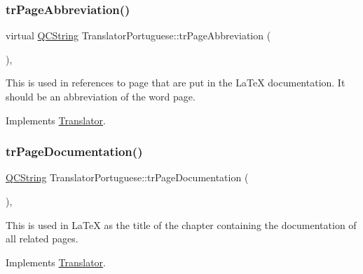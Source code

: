 \mbox{\label{class_translator_portuguese_a14ece07610419a00727fcd6fd852d556}} 
\subsubsection{\texorpdfstring{trPageAbbreviation()}{trPageAbbreviation()}}
{\footnotesize\ttfamily virtual \mbox{\hyperlink{class_q_c_string}{Q\+C\+String}} Translator\+Portuguese\+::tr\+Page\+Abbreviation (\begin{DoxyParamCaption}{ }\end{DoxyParamCaption})\hspace{0.3cm}{\ttfamily [inline]}, {\ttfamily [virtual]}}

This is used in references to page that are put in the La\+TeX documentation. It should be an abbreviation of the word page. 

Implements \mbox{\hyperlink{class_translator}{Translator}}.

\mbox{\label{class_translator_portuguese_a74d1d84882e71ad90a84cacdd585f2f1}} 
\subsubsection{\texorpdfstring{trPageDocumentation()}{trPageDocumentation()}}
{\footnotesize\ttfamily \mbox{\hyperlink{class_q_c_string}{Q\+C\+String}} Translator\+Portuguese\+::tr\+Page\+Documentation (\begin{DoxyParamCaption}{ }\end{DoxyParamCaption})\hspace{0.3cm}{\ttfamily [inline]}, {\ttfamily [virtual]}}

This is used in La\+TeX as the title of the chapter containing the documentation of all related pages. 

Implements \mbox{\hyperlink{class_translator}{Translator}}.

\mbox{\label{class_translator_portuguese_abf7f7f02aa0e6facf94e3d09fe5db7a0}} 
